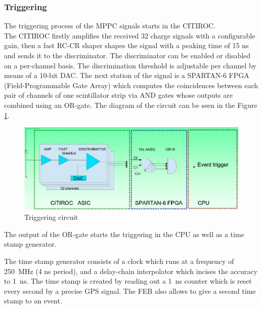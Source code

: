 \documentclass[a4paper]{article}\linespread{1.4}
\begin{document}
\subsubsection{Triggering}
The triggering process of the MPPC signals starts in the CITIROC. 
\\The CITIROC firstly amplifies the received 32 charge signals with a configurable gain, then a fast RC-CR shaper shapes the signal with a peaking time of 15 ns and sends it to the discriminator. The discriminator can be enabled or disabled on a per-channel basis. The discrimination threshold is adjustable per channel by means of a 10-bit DAC. The next station of the signal is a SPARTAN-6 FPGA (Field-Programmable Gate Array) which computes the coincidences between each pair of channels of one scintillator strip via AND gates whose outputs are combined using an OR-gate. The diagram of the circuit can be seen in the Figure \ref{fig:trig}. \begin{figure}[h!] \centering \includegraphics[width=120mm,scale=1.0]{figures/trig.png} \caption{Triggering circuit \cite{E}} \label{fig:trig} \end{figure}
The output of the OR-gate starts the triggering in the CPU as well as a time stamp generator. 

The time stamp generator consists of a clock which runs at a frequency of 250~MHz (4 ns period), and a delay-chain interpolator which incises the accuracy to 1~ns. The time stamp is created by reading out a 1~ns counter which is reset every second by a precise GPS signal. The FEB also allows to give a second time stamp to an event. 
\end{document}
